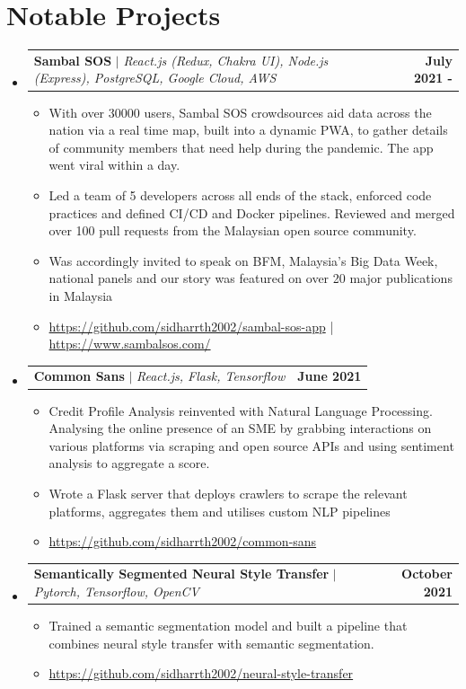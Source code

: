 \documentclass[letterpaper,12pt]{article}
\makeatletter
\newcommand{\resumeItem}[1]{
  \item\small{
    {#1 \vspace{-2pt}}
  }
}
\newcommand{\resumeProjectHeading}[2]{
    \item
    \begin{tabular*}{1.001\textwidth}{l@{\extracolsep{\fill}}r}
      \small#1 & \textbf{\small #2}\\
    \end{tabular*}\vspace{-7pt}
}
\newcommand{\resumeSubHeadingListStart}{\begin{itemize}[leftmargin=0.0in, label={}]}
\newcommand{\resumeSubHeadingListEnd}{\end{itemize}}
\newcommand{\resumeItemListStart}{\begin{itemize}}
\newcommand{\resumeItemListEnd}{\end{itemize}\vspace{-5pt}}
\makeatother
\begin{document}
\section{Notable Projects}
    \vspace{-5pt}
    \resumeSubHeadingListStart
      \resumeProjectHeading
          {\textbf{Sambal SOS} $|$ \emph{React.js (Redux, Chakra UI), Node.js (Express), PostgreSQL, Google Cloud, AWS}}{July 2021 - }
          \resumeItemListStart
            \resumeItem{With over 30000 users, Sambal SOS crowdsources aid data across the nation via a real time map, built into a dynamic PWA, to gather details of community members that need help during the pandemic. The app went viral within a day.}
            \resumeItem{Led a team of 5 developers across all ends of the stack, enforced code practices and defined CI/CD and Docker pipelines. Reviewed and merged over 100 pull requests from the Malaysian open source community.}
            \resumeItem{Was accordingly invited to speak on BFM, Malaysia's Big Data Week, national panels and our story was featured on over 20 major publications in Malaysia}
            \resumeItem{\url{https://github.com/sidharrth2002/sambal-sos-app} | \url{https://www.sambalsos.com/}}
          \resumeItemListEnd
          \vspace{-13pt}
      \resumeProjectHeading
          {\textbf{Common Sans} $|$ \emph{React.js, Flask, Tensorflow}}{June 2021}
          \resumeItemListStart
            \resumeItem{Credit Profile Analysis reinvented with Natural Language Processing. Analysing the online presence of an SME by grabbing interactions on various platforms via scraping and open source APIs and using sentiment analysis to aggregate a score.}
            \resumeItem{Wrote a Flask server that deploys crawlers to scrape the relevant platforms, aggregates them and utilises custom NLP pipelines}
            \resumeItem{\url{https://github.com/sidharrth2002/common-sans}}
            \resumeItemListEnd
          \vspace{-1pt}
      \resumeProjectHeading
          {\textbf{Semantically Segmented Neural Style Transfer} $|$ \emph{Pytorch, Tensorflow, OpenCV}}{October 2021}
          \resumeItemListStart
            \resumeItem{Trained a semantic segmentation model and built a pipeline that combines neural style transfer
            with semantic segmentation.}
            \resumeItem{\url{https://github.com/sidharrth2002/neural-style-transfer}}
            \resumeItemListEnd
          \vspace{-1pt}
    \resumeSubHeadingListEnd
\vspace{-15pt}
\end{document}

